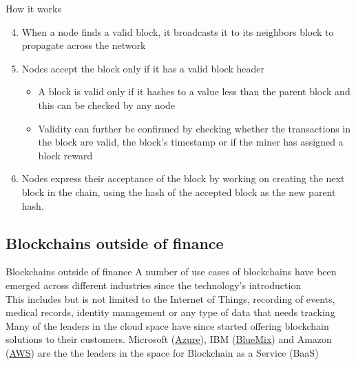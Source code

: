 \documentclass[9pt]{beamer}
\begin{document}
\begin{frame}{How it works}
	\begin{enumerate}
		\setcounter{enumi}{3}
		\item When a node finds a valid block, it broadcasts it to its neighbors block to propagate across the network
		\item Nodes accept the block only if it has a valid block header
		\begin{itemize}
			\item A block is valid only if it hashes to a value less than the parent block and this can be checked by any node
			\item Validity can further be confirmed by checking whether the transactions in the block are valid, the block's timestamp or if the miner has assigned a block reward
		\end{itemize}
		\item Nodes express their acceptance of the block by working on creating the next block in the chain, using the hash of the accepted block as the new parent hash.
	\end{enumerate}
\end{frame}


\subsection{Blockchains outside of finance}

\begin{frame}{Blockchains outside of finance}
	A number of use cases of blockchains have been emerged across different industries since the technology's introduction \\ \vspace{3mm}
	This includes but is not limited to the Internet of Things, recording of events, medical records, identity management or any type of data that needs tracking \\ \vspace{3mm}
	Many of the leaders in the cloud space have since started offering blockchain solutions to their customers.
	Microsoft (\href{https://azure.microsoft.com/en-us/solutions/blockchain/}{Azure}), IBM (\href{https://console.bluemix.net/catalog/services/blockchain/}{BlueMix}) and Amazon (\href{https://aws.amazon.com/marketplace/}{AWS}) are the the leaders in the space for Blockchain as a Service (BaaS)
\end{frame}
\end{document}
